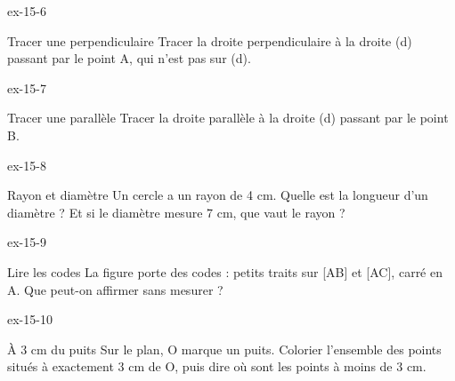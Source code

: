 \begin{blocLivre}{ex-15-6}\begin{exercice}[2]{Tracer une perpendiculaire}
Tracer la droite perpendiculaire à la droite (d) passant par le point A, qui n’est pas sur (d).
\label{fig-ex-15-6}
\end{exercice}\end{blocLivre}
\begin{blocLivre}{ex-15-7}\begin{exercice}[2]{Tracer une parallèle}
Tracer la droite parallèle à la droite (d) passant par le point B.
\label{fig-ex-15-7}
\end{exercice}\end{blocLivre}
\begin{blocLivre}{ex-15-8}\begin{exercice}[2]{Rayon et diamètre}
Un cercle a un rayon de 4 cm. Quelle est la longueur d’un diamètre ? Et si le diamètre mesure 7 cm, que vaut le rayon ?
\label{fig-ex-15-8}
\end{exercice}\end{blocLivre}
\begin{blocLivre}{ex-15-9}\begin{exercice}[2]{Lire les codes}
La figure porte des codes : petits traits sur [AB] et [AC], carré en A. Que peut-on affirmer sans mesurer ?
\label{fig-ex-15-9}
\end{exercice}\end{blocLivre}
\begin{blocLivre}{ex-15-10}\begin{exercice}[2]{À 3 cm du puits}
Sur le plan, O marque un puits. Colorier l’ensemble des points situés à exactement 3 cm de O, puis dire où sont les points à moins de 3 cm.
\label{fig-ex-15-10}
\end{exercice}\end{blocLivre}

